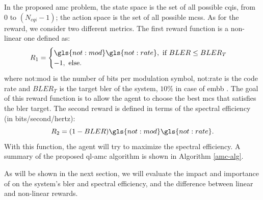 In the proposed \gls{amc} problem, the state space is the set of all possible \gls{cqi}s, from $0$ to $(N_{cqi}-1)$; the action space is the set of all possible \gls{mcs}s. As for the reward, we consider two different metrics.
%
The first reward function is a non-linear one defined as:
\begin{equation}\label{eq.:rewardBler}
  R_1 = \begin{cases}
  \gls{not:mod} \gls{not:rate}, \text{ if } BLER \leq BLER_T \\
  -1, \text{ else.}
\end{cases}
\end{equation}
\noindent where \gls{not:mod} is the number of bits per modulation symbol, \gls{not:rate} is the code rate and $BLER_T$ is the target \gls{bler} of the system, $10\%$ in case of \gls{embb} \cite{3gpp.38.214}.
%
The goal of this reward function is to allow the agent to choose the best \gls{mcs} that satisfies the \gls{bler} target. The second reward is defined in terms of the spectral efficiency (in bits/second/hertz):
\begin{equation}\label{eq.:rewardSE}
    R_2 = (1-BLER) \gls{not:mod} \gls{not:rate} \text{.}
\end{equation}
\noindent With this function, the agent will try to maximize the spectral efficiency.
A summary of the proposed \gls{ql-amc} algorithm is shown in Algorithm \ref{amc-alg}.



As will be shown in the next section, we will evaluate the impact and importance of on the system's \gls{bler} and spectral efficiency, and the difference between linear and non-linear rewards.

